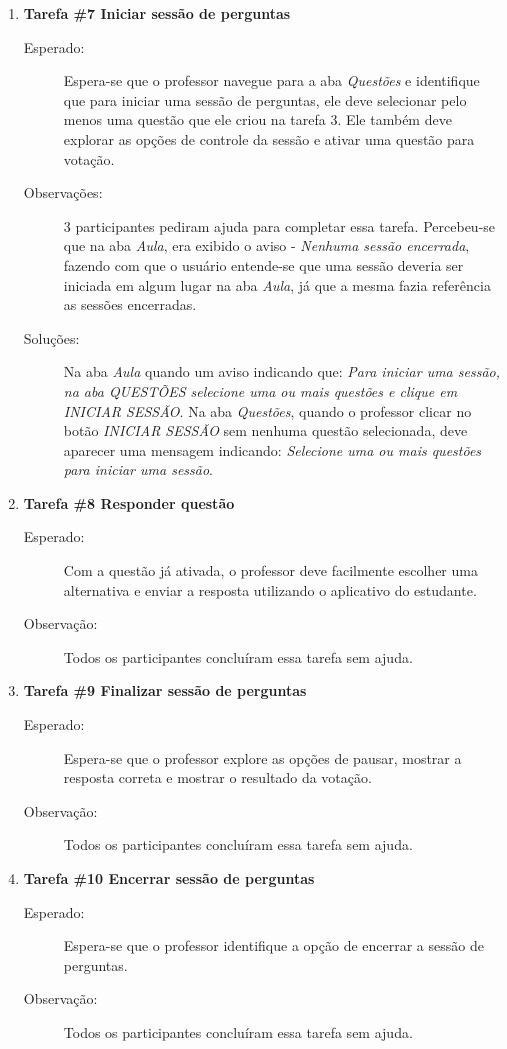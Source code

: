 \begin{enumerate}[label={},leftmargin=*]
  \item \textbf{Tarefa \#7 Iniciar sessão de perguntas}
  \begin{description}
    \item[Esperado:]  Espera-se que o professor navegue para a aba \textit{Questões} e identifique
    que para iniciar uma sessão de perguntas, ele deve selecionar pelo menos uma questão que ele criou
    na tarefa 3. Ele também deve explorar as opções de controle da sessão e ativar uma questão para votação.
    \item[Observações:] 3 participantes pediram ajuda para completar essa tarefa. Percebeu-se que
    na aba \textit{Aula}, era exibido o aviso - \textit{Nenhuma sessão encerrada}, fazendo
    com que o usuário entende-se que uma sessão deveria ser iniciada em algum lugar na aba \textit{Aula}, já que
    a mesma fazia referência as sessões encerradas.
    \item[Soluções:] Na aba \textit{Aula} quando um aviso indicando que:
    \textit{Para iniciar uma sessão, na aba QUESTÕES selecione uma ou mais questões e clique em INICIAR SESSÃO}.
    Na aba \textit{Questões}, quando o professor clicar no botão \textit{INICIAR SESSÃO} sem nenhuma
    questão selecionada, deve aparecer uma mensagem indicando: \textit{Selecione uma ou mais questões para iniciar uma sessão}.
  \end{description}

  \item \textbf{Tarefa \#8 Responder questão}
  \begin{description}
    \item [Esperado:] Com a questão já ativada, o professor deve facilmente escolher uma alternativa e
    enviar a resposta utilizando o aplicativo do estudante.
    \item [Observação:] Todos os participantes concluíram essa tarefa sem ajuda.
  \end{description}

  \item \textbf{Tarefa \#9 Finalizar sessão de perguntas}
  \begin{description}
    \item  [Esperado:]  Espera-se que o professor explore as opções de pausar, mostrar a resposta correta e mostrar
    o resultado da votação.
    \item [Observação:] Todos os participantes concluíram essa tarefa sem ajuda.
  \end{description}

  \item \textbf{Tarefa \#10 Encerrar sessão de perguntas}
  \begin{description}
    \item  [Esperado:] Espera-se que o professor identifique a opção de encerrar a sessão de perguntas.
    \item [Observação:] Todos os participantes concluíram essa tarefa sem ajuda.
  \end{description}


\end{enumerate}

